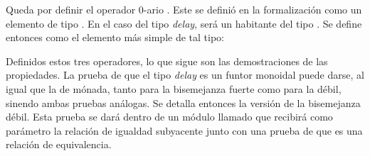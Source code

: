Queda por definir el operador 0-ario . Este se definió en la formalización como un elemento de tipo  \AgdaDatatype{$\top$}. En el caso del tipo \textit{delay}, será un habitante del tipo \AgdaDatatype{$\top$ $\bot$}. Se define entonces  como el elemento más simple de tal tipo:


Definidos estos tres operadores, lo que sigue son las demostraciones de las propiedades. La prueba de que el tipo \textit{delay} es un funtor monoidal puede darse, al igual que la de mónada, tanto para la bisemejanza fuerte como para la débil, sinendo ambas pruebas análogas. Se detalla entonces la versión de la bisemejanza débil. Esta prueba se dará dentro de un módulo llamado  que recibirá como parámetro la relación de igualdad subyacente junto con una prueba de que es una relación de equivalencia. 

